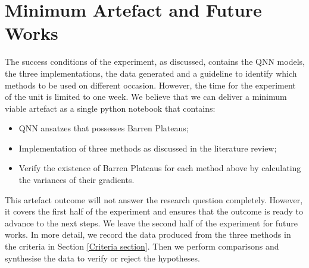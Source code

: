 \section{Minimum Artefact and Future Works}

The success conditions of the experiment, as discussed, contains the QNN models, the three implementations, the data generated and a guideline to identify which methods to be used on different occasion.
However, the time for the experiment of the unit is limited to one week. We believe that we can deliver a minimum viable artefact as a single python notebook that contains:
\begin{itemize}
    \item QNN ansatzes that possesses Barren Plateaus;
    \item Implementation of three methods as discussed in the literature review;
    \item Verify the existence of Barren Plateaus for each method above by calculating the variances of their gradients.
\end{itemize}

This artefact outcome will not answer the research question completely. 
However, it covers the first half of the experiment and ensures that the outcome is ready to advance to the next steps.
We leave the second half of the experiment for future works.
In more detail, we record the data produced from the three methods in the criteria in Section \ref{Criteria section}. 
Then we perform comparisons and synthesise the data to verify or reject the hypotheses.
